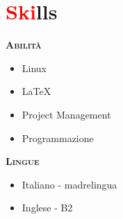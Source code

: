 \section*{\textcolor{red}{Ski}lls}
\begin{multicols}{2}
    \large{\textbf{\textsc{Abilità}}}
    \begin{itemize}
        \item Linux
        \item \LaTeX
        \item Project Management
        \item Programmazione
    \end{itemize}
    \vfill\null\columnbreak
    \large{\textbf{\textsc{Lingue}}}
    \begin{itemize}
        \item Italiano - madrelingua
        \item Inglese - B2
    \end{itemize}
\end{multicols}